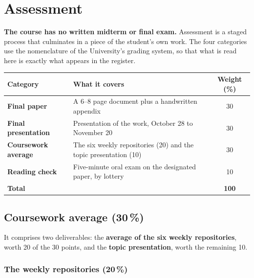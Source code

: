 \documentclass[11pt]{article}
\begin{document}
\section{Assessment}

\textbf{The course has no written midterm or final exam.} Assessment is a staged process that culminates in a piece of the student's own work. The four categories use the nomenclature of the University's grading system, so that what is read here is exactly what appears in the register.

\begin{center}
\begin{tabularx}{\textwidth}{@{}lXc@{}}
\toprule
\textbf{Category} & \textbf{What it covers} & \textbf{Weight (\%)} \\
\midrule
\textbf{Final paper} & A 6--8 page document plus a handwritten appendix & 30 \\
\textbf{Final presentation} & Presentation of the work, October 28 to November 20 & 30 \\
\textbf{Coursework average} & The six weekly repositories (20) and the topic presentation (10) & 30 \\
\textbf{Reading check} & Five-minute oral exam on the designated paper, by lottery & 10 \\
\midrule
\textbf{Total} & & \textbf{100} \\
\bottomrule
\end{tabularx}
\end{center}

\subsection*{Coursework average (30\,\%)}

It comprises two deliverables: the \textbf{average of the six weekly repositories}, worth 20 of the 30 points, and the \textbf{topic presentation}, worth the remaining 10.

\subsubsection*{The weekly repositories (20\,\%)}
\end{document}
